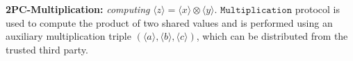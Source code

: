 \documentclass[letterpaper]{article} %
\begin{document}

    \textbf{2PC-Multiplication:}
    \emph{computing}
    $ \langle z\rangle  = \langle x\rangle  \otimes \langle y\rangle $.
    $\mathtt{Multiplication}$ protocol is used to compute the product of two shared values
    and is performed using an auxiliary multiplication triple
    $(\langle a\rangle,\langle b\rangle,\langle c\rangle)$,
    which can be distributed from the trusted third party.
\end{document}
